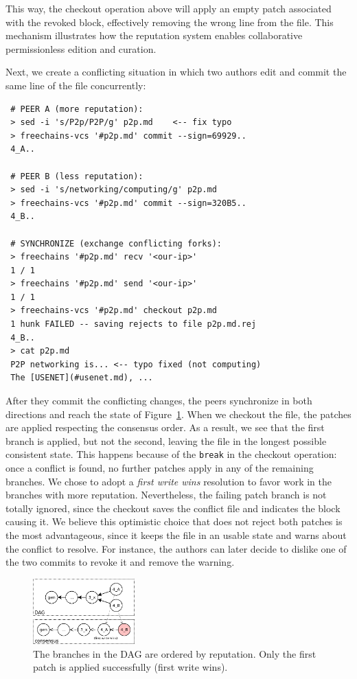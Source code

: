 \documentclass[12pt]{article}
\newcommand{\code}[1]  {\texttt{\footnotesize{#1}}}
\begin{document}
This way, the checkout operation above will apply an empty patch associated
with the revoked block, effectively removing the wrong line from the file.
This mechanism illustrates how the reputation system enables collaborative
permissionless edition and curation.

Next, we create a conflicting situation in which two authors edit and commit
the same line of the file concurrently:

{\footnotesize
\begin{verbatim}
 # PEER A (more reputation):
 > sed -i 's/P2p/P2P/g' p2p.md    <-- fix typo
 > freechains-vcs '#p2p.md' commit --sign=69929..
 4_A..

 # PEER B (less reputation):
 > sed -i 's/networking/computing/g' p2p.md
 > freechains-vcs '#p2p.md' commit --sign=320B5..
 4_B..

 # SYNCHRONIZE (exchange conflicting forks):
 > freechains '#p2p.md' recv '<our-ip>'
 1 / 1
 > freechains '#p2p.md' send '<our-ip>'
 1 / 1
 > freechains-vcs '#p2p.md' checkout p2p.md
 1 hunk FAILED -- saving rejects to file p2p.md.rej
 4_B..
 > cat p2p.md
 P2P networking is... <-- typo fixed (not computing)
 The [USENET](#usenet.md), ...
\end{verbatim}
}

After they commit the conflicting changes, the peers synchronize in both
directions and reach the state of Figure~\ref{fig.conflict}.
When we checkout the file, the patches are applied respecting the consensus
order.
As a result, we see that the first branch is applied, but not the second,
leaving the file in the longest possible consistent state.
%
This happens because of the \code{break} in the checkout operation:
once a conflict is found, no further patches apply in any of the remaining
branches.
%
We chose to adopt a \emph{first write wins} resolution to favor work in the
branches with more reputation.
Nevertheless, the failing patch branch is not totally ignored, since the
checkout saves the conflict file and indicates the block causing it.
%
We believe this optimistic choice that does not reject both patches is the most
advantageous, since it keeps the file in an usable state and warns about the
conflict to resolve.
For instance, the authors can later decide to dislike one of the two commits to
revoke it and remove the warning.

\begin{figure}
\centering
\includegraphics[width=0.35\textwidth]{conflict.png}
\caption{
    The branches in the DAG are ordered by reputation.
    Only the first patch is applied successfully (first write wins).
}
\label{fig.conflict}
\end{figure}
\end{document}
